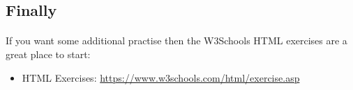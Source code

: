 \documentclass[10pt, a4paper]{article}
\begin{document}
\subsection{Finally}
\paragraph{} If you want some additional practise then the W3Schools HTML exercises are a great place to start:

\begin{itemize}
\item HTML Exercises: \url{https://www.w3schools.com/html/exercise.asp}
\end{itemize}





%

%
\end{document}
